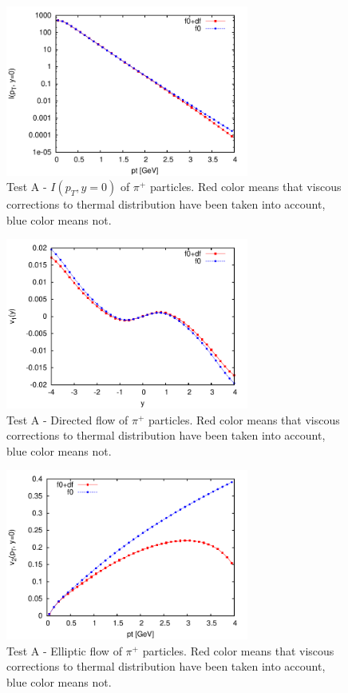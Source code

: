 \begin{figure}[!h]
 \begin{center}
  \includegraphics[width=8cm]{images/spectra_pi_plus.pdf}
   \caption{Test A -  $I(p_T,y=0)$ of $\pi^+$ particles. Red color means that viscous corrections to thermal distribution have been taken into account, blue color means not.}
    \label{plotI}
 \end{center}
\end{figure}
\begin{figure}[!h]
 \begin{center}
  \includegraphics[width=8cm]{images/v1_pi_plus.pdf}
   \caption{Test A -  Directed flow of $\pi^+$ particles. Red color means that viscous corrections to thermal distribution have been taken into account, blue color means not.}
    \label{plotv1}
 \end{center}
\end{figure}
\begin{figure}[!h]
 \begin{center}
  \includegraphics[width=8cm]{images/v2_pi_plus.pdf}
   \caption{Test A -  Elliptic flow of $\pi^+$ particles. Red color means that viscous corrections to thermal distribution have been taken into account, blue color means not.}
    \label{plotv2}
 \end{center}
\end{figure}
